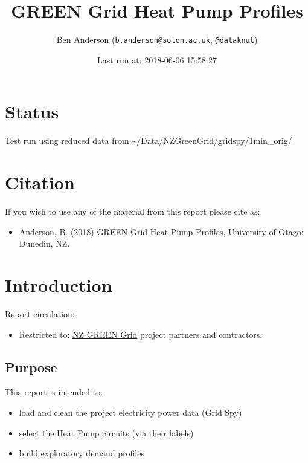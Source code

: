 \documentclass[]{article}
\title{GREEN Grid Heat Pump Profiles}
\author{Ben Anderson
(\href{mailto:b.anderson@soton.ac.uk}{\nolinkurl{b.anderson@soton.ac.uk}},
\texttt{@dataknut})}
\date{Last run at: 2018-06-06 15:58:27}
\providecommand{\tightlist}{%
  \setlength{\itemsep}{0pt}\setlength{\parskip}{0pt}}
\begin{document}
\maketitle

{
\setcounter{tocdepth}{2}
\tableofcontents
}
\newpage

\section{Status}\label{status}

Test run using reduced data from
\textasciitilde{}/Data/NZGreenGrid/gridspy/1min\_orig/

\section{Citation}\label{citation}

If you wish to use any of the material from this report please cite as:

\begin{itemize}
\tightlist
\item
  Anderson, B. (2018) GREEN Grid Heat Pump Profiles, University of
  Otago: Dunedin, NZ.
\end{itemize}

\newpage

\section{Introduction}\label{introduction}

Report circulation:

\begin{itemize}
\tightlist
\item
  Restricted to:
  \href{https://www.otago.ac.nz/centre-sustainability/research/energy/otago050285.html}{NZ
  GREEN Grid} project partners and contractors.
\end{itemize}

\subsection{Purpose}\label{purpose}

This report is intended to:

\begin{itemize}
\tightlist
\item
  load and clean the project electricity power data (Grid Spy)
\item
  select the Heat Pump circuits (via their labels)
\item
  build exploratory demand profiles
\end{itemize}
\end{document}
